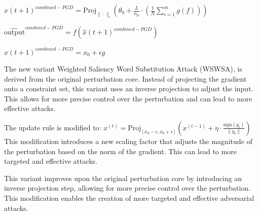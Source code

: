 $\hat{x}(t+1)^{combined-PGD} = \text{Proj}_{\|\cdot\|_{\epsilon}} \left( \theta_0 + \frac{L}{n_\mu} \cdot \left( \frac{1}{N} \sum_{i=1}^{m} g(f) \right) \right)$

$\hat{\text{output}}^{combined-PGD} = f \left( \hat{x}(t+1)^{combined-PGD} \right)$

$\hat{x}(t+1)^{combined-PGD} = x_0 + \epsilon g$

The new variant Weighted Saliency Word Substitution Attack (WSWSA), is derived from the original perturbation core. Instead of projecting the gradient onto a constraint set, this variant uses an inverse projection to adjust the input. This allows for more precise control over the perturbation and can lead to more effective attacks.

The update rule is modified to:
$x^{(t)} = \text{Proj}_{[x_0 - \epsilon, x_0 + \epsilon]} \left( x^{(t-1)} + \eta \cdot \frac{\text{sign}(g_t)}{\|g_t\|} \right)$
This modification introduces a new scaling factor that adjusts the magnitude of the perturbation based on the norm of the gradient. This can lead to more targeted and effective attacks.

This variant improves upon the original perturbation core by introducing an inverse projection step, allowing for more precise control over the perturbation. This modification enables the creation of more targeted and effective adversarial attacks.